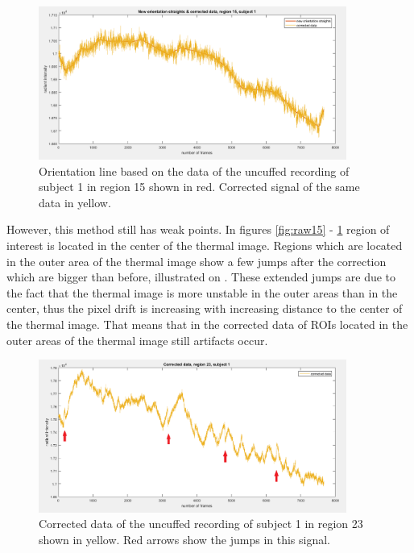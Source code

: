 \begin{figure}[H]
	\includegraphics[width=0.9\textwidth]{figures/corr15}
	\caption{Orientation line based on the data of the uncuffed recording of subject 1 in region 15 shown in red. Corrected signal of the same data in yellow.}
	\label{fig:corr15}
\end{figure}
However, this method still has weak points. In figures \ref{fig:raw15} - \ref{fig:corr15} region of interest is located in the center of the thermal image. Regions which are located in the outer area of the thermal image show a few jumps after the correction which are bigger than before, illustrated on . These extended jumps are due to the fact that the thermal image is more unstable in the outer areas than in the center, thus the pixel drift is increasing with increasing distance to the center of the thermal image. That means that in the corrected data of ROIs located in the outer areas of the thermal image still artifacts occur. 
\begin{figure}[H]
	\includegraphics[width=0.9\textwidth]{figures/corr23pfeile}
	\caption{Corrected data of the uncuffed recording of subject 1 in region 23 shown in yellow. Red arrows show the jumps in this signal.}
	\label{fig:corr23}
\end{figure}
